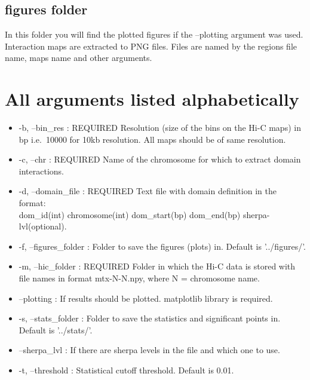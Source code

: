 \subsection{figures folder}
In this folder you will find the plotted figures if the --plotting argument was used. Interaction maps are
extracted to PNG files. Files are named by the regions file name, maps name and other arguments.

\section{All arguments listed alphabetically}
\label{sec:arguments2}
\begin{itemize}
    \item -b, --bin\_res : REQUIRED Resolution (size of the bins on the Hi-C maps) in bp i.e.~10000 for 10kb resolution.
All maps should be of same resolution.
\item -c, --chr : REQUIRED Name of the chromosome for which to extract domain interactions.
    \item -d, --domain\_file : REQUIRED Text file with domain definition in the format: \\
    dom\_id(int) chromosome(int) dom\_start(bp) dom\_end(bp) sherpa-lvl(optional).
    \item -f, --figures\_folder : Folder to save the figures (plots) in. Default is '../figures/'.
    \item -m, --hic\_folder : REQUIRED Folder in which the Hi-C data is stored with file names in format mtx-N-N.npy, where
N = chromosome name.
\item --plotting : If results should be plotted. matplotlib library is required.
    \item -s, --stats\_folder : Folder to save the statistics and significant points in. Default is '../stats/'.
    \item --sherpa\_lvl : If there are sherpa levels in the file and which one to use.
\item -t, --threshold :  Statistical cutoff threshold. Default is 0.01.
\end{itemize}




